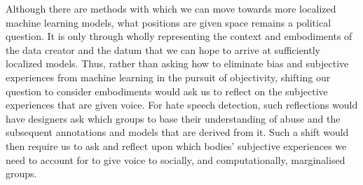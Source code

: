 Although there are methods with which we can move towards more localized machine learning models, what positions are given space remains a political question. It is only through wholly representing the context and embodiments of the data creator and the datum that we can hope to arrive at sufficiently localized models. Thus, rather than asking how to eliminate bias and subjective experiences from machine learning in the pursuit of objectivity, shifting our question to consider embodiments would ask us to reflect on the subjective experiences that are given voice. For hate speech detection, such reflections would have designers ask which groups to base their understanding of abuse and the subsequent annotations and models that are derived from it. Such a shift would then require us to ask and reflect upon which bodies' subjective experiences we need to account for to give voice to socially, and computationally, marginalised groups.

%
%

